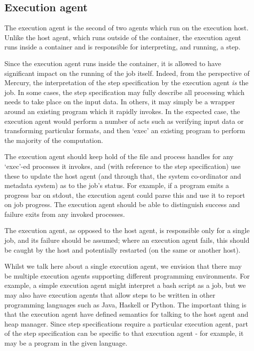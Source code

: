 \documentclass[10pt,a4paper]{article}
\newcommand{\npar}{\par\noindent\space}
\begin{document}
\subsection{Execution agent}
\label{sec:executionAgent}
\npar The execution agent is the second of two agents which run on the execution host. Unlike the host agent, which runs outside of the container, the execution agent runs inside a container and is responsible for interpreting, and running, a step.
\npar Since the execution agent runs inside the container, it is allowed to have significant impact on the running of the job itself. Indeed, from the perspective of Mercury, the interpretation of the step specification by the execution agent \textit{is} the job. In some cases, the step specification may fully describe all processing which needs to take place on the input data. In others, it may simply be a wrapper around an existing program which it rapidly invokes. In the expected case, the execution agent would perform a number of acts such as verifying input data or transforming particular formats, and then `exec' an existing program to perform the majority of the computation.
\npar The execution agent should keep hold of the file and process handles for any `exec'-ed processes it invokes, and (with reference to the step specification) use these to update the host agent (and through that, the system co-ordinator and metadata system) as to the job's status. For example, if a program emits a progress bar on stdout, the execution agent could parse this and use it to report on job progress. The execution agent should be able to distinguish success and failure exits from any invoked processes.
\npar The execution agent, as opposed to the host agent, is responsible only for a single job, and its failure should be assumed; where an execution agent fails, this should be caught by the host and potentially restarted (on the same or another host).
\npar Whilst we talk here about a single execution agent, we envision that there may be multiple execution agents supporting different programming environments. For example, a simple execution agent might interpret a bash script as a job, but we may also have execution agents that allow steps to be written in other programming languages such as Java, Haskell or Python. The important thing is that the execution agent have defined semantics for talking to the host agent and heap manager. Since step specifications require a particular execution agent, part of the step specification can be specific to that execution agent - for example, it may be a program in the given language.
\end{document}
